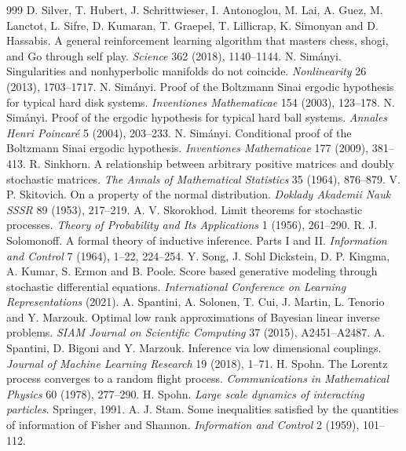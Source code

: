 \begin{thebibliography}{999}
 D. Silver, T. Hubert, J. Schrittwieser, I. Antonoglou, M. Lai, A. Guez, M. Lanctot, L. Sifre, D. Kumaran, T. Graepel, T. Lillicrap, K. Simonyan and D. Hassabis. A general reinforcement learning algorithm that masters chess, shogi, and Go through self play. \emph{Science} 362 (2018), 1140--1144.
 N. Sim\'anyi. Singularities and nonhyperbolic manifolds do not coincide. \emph{Nonlinearity} 26 (2013), 1703--1717.
 N. Sim\'anyi. Proof of the Boltzmann Sinai ergodic hypothesis for typical hard disk systems. \emph{Inventiones Mathematicae} 154 (2003), 123--178.
 N. Sim\'anyi. Proof of the ergodic hypothesis for typical hard ball systems. \emph{Annales Henri Poincar\'e} 5 (2004), 203--233.
 N. Sim\'anyi. Conditional proof of the Boltzmann Sinai ergodic hypothesis. \emph{Inventiones Mathematicae} 177 (2009), 381--413.
 R. Sinkhorn. A relationship between arbitrary positive matrices and doubly stochastic matrices. \emph{The Annals of Mathematical Statistics} 35 (1964), 876--879.
 V. P. Skitovich. On a property of the normal distribution. \emph{Doklady Akademii Nauk SSSR} 89 (1953), 217--219.
 A. V. Skorokhod. Limit theorems for stochastic processes. \emph{Theory of Probability and Its Applications} 1 (1956), 261--290.
 R. J. Solomonoff. A formal theory of inductive inference. Parts I and II. \emph{Information and Control} 7 (1964), 1--22, 224--254.
 Y. Song, J. Sohl Dickstein, D. P. Kingma, A. Kumar, S. Ermon and B. Poole. Score based generative modeling through stochastic differential equations. \emph{International Conference on Learning Representations} (2021).
 A. Spantini, A. Solonen, T. Cui, J. Martin, L. Tenorio and Y. Marzouk. Optimal low rank approximations of Bayesian linear inverse problems. \emph{SIAM Journal on Scientific Computing} 37 (2015), A2451--A2487.
 A. Spantini, D. Bigoni and Y. Marzouk. Inference via low dimensional couplings. \emph{Journal of Machine Learning Research} 19 (2018), 1--71.
 H. Spohn. The Lorentz process converges to a random flight process. \emph{Communications in Mathematical Physics} 60 (1978), 277--290.
 H. Spohn. \emph{Large scale dynamics of interacting particles}. Springer, 1991.
 A. J. Stam. Some inequalities satisfied by the quantities of information of Fisher and Shannon. \emph{Information and Control} 2 (1959), 101--112.

\end{thebibliography}
